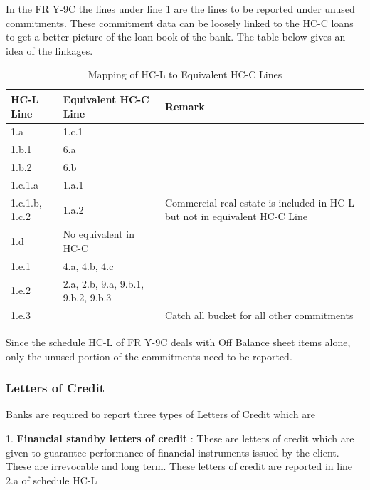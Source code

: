 \documentclass[conference]{IEEEtran}
\begin{document}
         In the FR Y-9C the lines under line 1 are the lines to be reported under unused commitments. These commitment data can be loosely linked to the HC-C loans to get a better picture of the loan book of the bank. The table below gives an idea of the linkages.
         \begin{table}[htbp]
         	\centering
         	\caption{Mapping of HC-L to Equivalent HC-C Lines}
         	\begin{tabular}{|p{1.5cm}|p{1.5cm}|p{4cm}|}
         		\hline
         		\textbf{HC-L Line} & \textbf{Equivalent HC-C Line} & \textbf{Remark} \\
         		\hline
         		1.a & 1.c.1 &  \\
         		\hline
         		1.b.1 & 6.a &  \\
         		\hline
         		1.b.2 & 6.b &  \\
         		\hline
         		1.c.1.a & 1.a.1 &  \\
         		\hline
         		1.c.1.b, 1.c.2 & 1.a.2 & Commercial real estate is included in HC-L but not in equivalent HC-C Line \\
         		\hline
         		1.d & No equivalent in HC-C &  \\
         		\hline
         		1.e.1 & 4.a, 4.b, 4.c &  \\
         		\hline
         		1.e.2 & 2.a, 2.b, 9.a, 9.b.1, 9.b.2, 9.b.3 &  \\
         		\hline
         		1.e.3 &  & Catch all bucket for all other commitments \\
         		\hline
         	\end{tabular}
         \end{table}
         
         Since the schedule HC-L of FR Y-9C deals with Off Balance sheet items alone, only the unused portion of the commitments need to be reported.
       
       \subsubsection{Letters of Credit}
       Banks are required to report three types of Letters of Credit which are 
       
       1. \textbf{Financial standby letters of credit} : These are letters of credit which are given to guarantee performance of financial instruments issued by the client. These are irrevocable and long term. These letters of credit are reported in line 2.a of schedule HC-L
       
\end{document}
